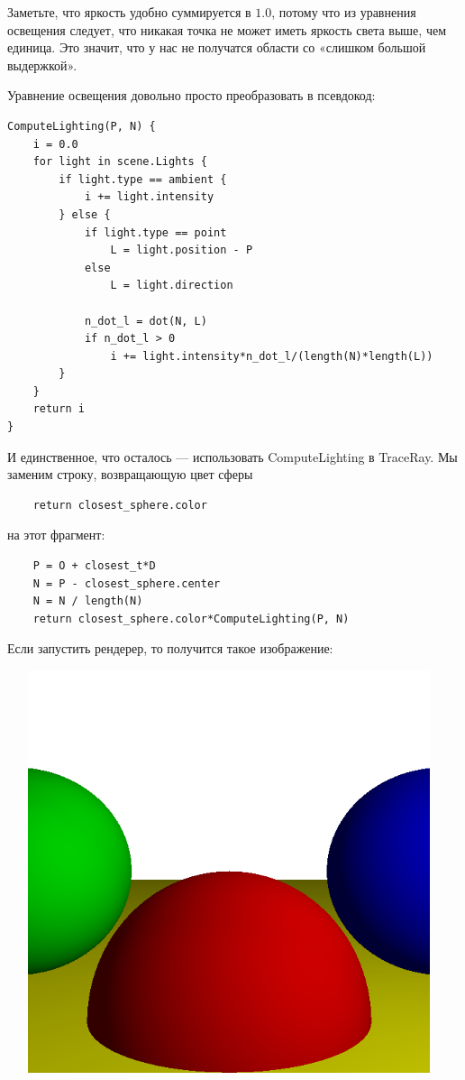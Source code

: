 Заметьте, что яркость удобно суммируется в $1.0$, потому что из уравнения освещения следует, что никакая точка не может иметь яркость света выше, чем единица. Это значит, что у нас не получатся области со «слишком большой выдержкой».

Уравнение освещения довольно просто преобразовать в псевдокод:
\begin{lstlisting}
ComputeLighting(P, N) {
    i = 0.0
    for light in scene.Lights {
        if light.type == ambient {
            i += light.intensity
        } else {
            if light.type == point
                L = light.position - P
            else
                L = light.direction

            n_dot_l = dot(N, L)
            if n_dot_l > 0
                i += light.intensity*n_dot_l/(length(N)*length(L))
        }
    }
    return i
}
\end{lstlisting}

И единственное, что осталось — использовать ComputeLighting в TraceRay. Мы заменим строку, возвращающую цвет сферы

\begin{lstlisting}
    return closest_sphere.color
\end{lstlisting}

на этот фрагмент:

\begin{lstlisting}
    P = O + closest_t*D  
    N = P - closest_sphere.center 
    N = N / length(N)
    return closest_sphere.color*ComputeLighting(P, N)
\end{lstlisting}

\newpage
Если запустить рендерер, то получится такое изображение:

\includegraphics[width=13cm, height=11.8cm]{second_example.png}

